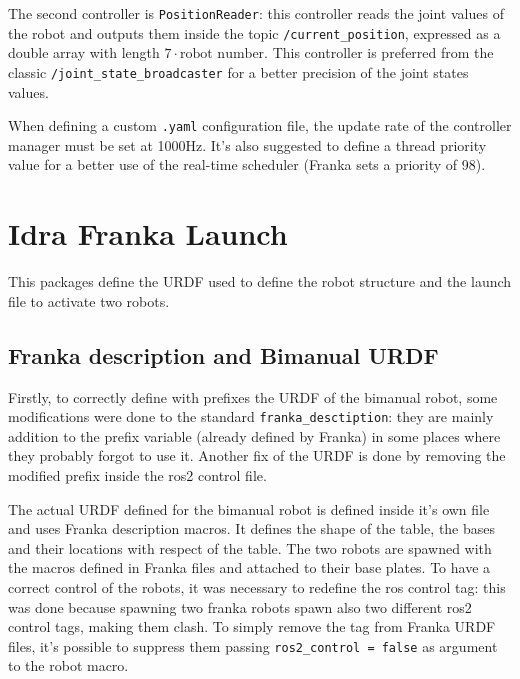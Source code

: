\documentclass{article}
\begin{document}
The second controller is \texttt{PositionReader}: this controller reads the joint values of the robot and outputs them inside the topic \texttt{/current\_position}, expressed as a double array with length $7 \cdot \text{robot number}$. This controller is preferred from the classic \texttt{/joint\_state\_broadcaster} for a better precision of the joint states values.

When defining a custom \texttt{.yaml} configuration file, the update rate of the controller manager must be set at 1000Hz. It's also suggested to define a thread priority value for a better use of the real-time scheduler (Franka sets a priority of 98).

\section{Idra Franka Launch}

This packages define the URDF used to define the robot structure and the launch file to activate two robots.

\subsection{Franka description and Bimanual URDF}

Firstly, to correctly define with prefixes the URDF of the bimanual robot, some modifications were done to the standard \texttt{franka\_desctiption}: they are mainly addition to the prefix variable (already defined by Franka) in some places where they probably forgot to use it. Another fix of the URDF is done by removing the modified prefix inside the ros2 control file.

The actual URDF defined for the bimanual robot is defined inside it's own file and uses Franka description macros. It defines the shape of the table, the bases and their locations with respect of the table. The two robots are spawned with the macros defined in Franka files and attached to their base plates. 
To have a correct control of the robots, it was necessary to redefine the ros control tag: this was done because spawning two franka robots spawn also two different ros2 control tags, making them clash. To simply remove the tag from Franka URDF files, it's possible to suppress them passing \texttt{ros2\_control = false} as argument to the robot macro.
\end{document}
